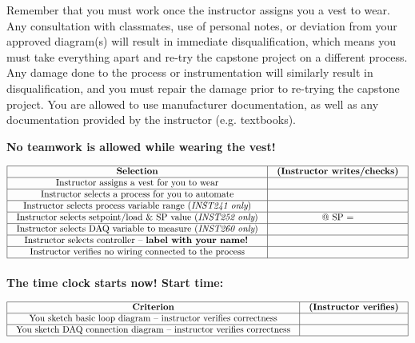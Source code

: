 \vskip 10pt

Remember that you must work  once the instructor assigns you a vest to wear.  Any consultation with classmates, use of personal notes, or deviation from your approved diagram(s) will result in immediate disqualification, which means you must take everything apart and re-try the capstone project on a different process.  Any damage done to the process or instrumentation will similarly result in disqualification, and you must repair the damage prior to re-trying the capstone project.  You are allowed to use manufacturer documentation, as well as any documentation provided by the instructor (e.g. textbooks).

\vskip 20pt

\centerline{\bf No teamwork is allowed while wearing the vest!}

\vskip 10pt


$$\vbox{\offinterlineskip
\halign{\strut
\vrule \quad\hfil # \ \hfil & 
\vrule \quad\hfil # \ \hfil \vrule \cr
\noalign{\hrule}
%
{\bf Selection} & {\bf (Instructor writes/checks)} \cr
%
\noalign{\hrule}
%
Instructor assigns a vest for you to wear &  \cr
%
\noalign{\hrule}
%
Instructor selects a process for you to automate &  \cr
%
\noalign{\hrule}
%
Instructor selects process variable range ({\it INST241 only}) &  \cr
%
\noalign{\hrule}
%
Instructor selects setpoint/load \& SP value ({\it INST252 only}) & @ SP =  \cr
%
\noalign{\hrule}
%
Instructor selects DAQ variable to measure ({\it INST260 only}) &  \cr
%
\noalign{\hrule}
%
Instructor selects controller -- {\bf label with your name!} &  \cr
%
\noalign{\hrule}
%
Instructor verifies no wiring connected to the process &  \cr
%
\noalign{\hrule}
} %
}$$ %

\vskip 10pt

\centerline{\bf The time clock starts now! \hskip 50pt Start time: \underbar{\hskip 80pt}}

\vskip 10pt


$$\vbox{\offinterlineskip
\halign{\strut
\vrule \quad\hfil # \ \hfil & 
\vrule \quad\hfil # \ \hfil \vrule \cr
\noalign{\hrule}
%
{\bf Criterion} & {\bf (Instructor verifies)} \cr
%
\noalign{\hrule}
%
You sketch basic loop diagram -- instructor verifies correctness &  \cr
%
\noalign{\hrule}
%
You sketch DAQ connection diagram -- instructor verifies correctness &  \cr
%
\noalign{\hrule}
} %
}$$ %

